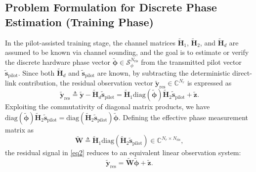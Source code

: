 \documentclass[conference]{IEEEtran}
\begin{document}
\subsection{Problem Formulation for Discrete Phase Estimation (Training Phase)}
In the pilot-assisted training stage, the channel matrices $\tilde{\mathbf{H}}_1$, $\tilde{\mathbf{H}}_2$, and $\tilde{\mathbf{H}}_d$ are assumed to be known via channel sounding, and the goal is to estimate or verify the discrete hardware phase vector $\tilde{\boldsymbol{\phi}} \in \mathcal{S}_{\phi}^{N_{\mathrm{ris}}}$ from the transmitted pilot vector $\tilde{\mathbf{s}}_{\mathrm{pilot}}$. Since both $\tilde{\mathbf{H}}_d$ and $\tilde{\mathbf{s}}_{\mathrm{pilot}}$ are known, by subtracting the deterministic direct-link contribution, the residual observation vector $\tilde{\mathbf{y}}_{\mathrm{res}} \in \mathbb{C}^{N_r}$ is expressed as
\begin{equation}
	\tilde{\mathbf{y}}_{\mathrm{res}} \triangleq \tilde{\mathbf{y}} - \tilde{\mathbf{H}}_d \tilde{\mathbf{s}}_{\mathrm{pilot}} = \tilde{\mathbf{H}}_1 \mathrm{diag}(\tilde{\boldsymbol{\phi}}) \tilde{\mathbf{H}}_2 \tilde{\mathbf{s}}_{\mathrm{pilot}} + \tilde{\mathbf{z}}. \label{eq2}
\end{equation}
Exploiting the commutativity of diagonal matrix products, we have $\mathrm{diag}(\tilde{\boldsymbol{\phi}})\tilde{\mathbf{H}}_2 \tilde{\mathbf{s}}_{\mathrm{pilot}} = \mathrm{diag}(\tilde{\mathbf{H}}_2 \tilde{\mathbf{s}}_{\mathrm{pilot}})\tilde{\boldsymbol{\phi}}$. Defining the effective phase measurement matrix as
\begin{equation}
	\tilde{\mathbf{W}} \triangleq \tilde{\mathbf{H}}_1 \mathrm{diag}(\tilde{\mathbf{H}}_2 \tilde{\mathbf{s}}_{\mathrm{pilot}}) \in \mathbb{C}^{N_r \times N_{\mathrm{ris}}},
\end{equation}
the residual signal in \eqref{eq2} reduces to an equivalent linear observation system:
\begin{equation}
	\tilde{\mathbf{y}}_{\mathrm{res}} = \tilde{\mathbf{W}}\tilde{\boldsymbol{\phi}} + \tilde{\mathbf{z}}. \label{eq3}
\end{equation}
\end{document}
